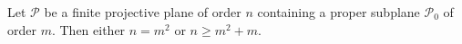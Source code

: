 Let $\mathcal{P}$ be a finite projective plane of order $n$ containing a proper subplane $\mathcal{P}_0$ of order $m$. Then either $n = m^2$ or $n \geq m^2 + m$.
